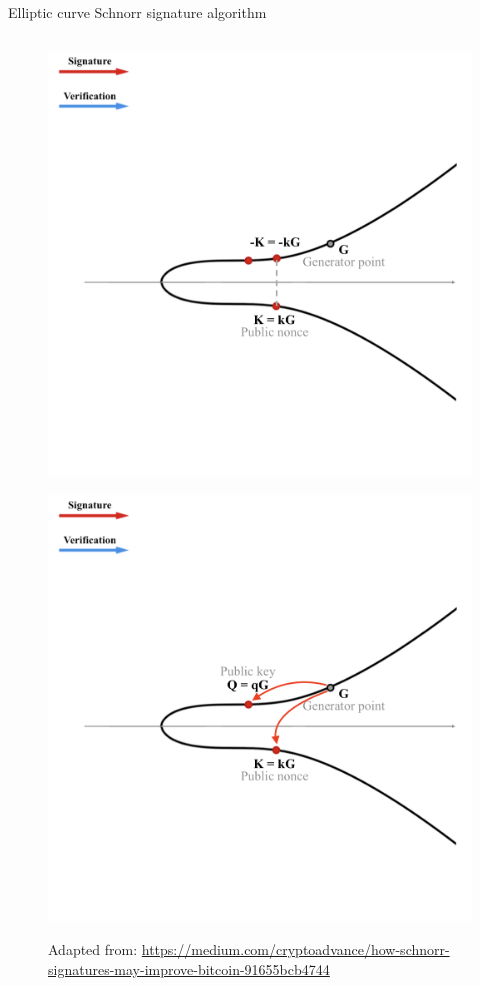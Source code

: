 \documentclass[slidescentered]{beamer}
\newcommand{\source}[1]{\caption*{\tiny Adapted from: {#1}} }
\begin{document}
\begin{frame}{Elliptic curve Schnorr signature algorithm}
\begin{columns}
\begin{column}{0.5\linewidth}
\begin{figure}
{						\source{\tiny \url{https://medium.com/cryptoadvance/how-schnorr-signatures-may-improve-bitcoin-91655bcb4744}}}
					 {\vspace*{-0.7cm}
						\hspace*{-0.9cm}
						\includegraphics[scale=0.28]{images/Schnorr4}
						\source{\tiny \url{https://medium.com/cryptoadvance/how-schnorr-signatures-may-improve-bitcoin-91655bcb4744}}}
					 {\vspace*{-0.7cm}
						\hspace*{-0.9cm}
						\includegraphics[scale=0.28]{images/Schnorr3}
}
\end{figure}
\end{column}
\end{columns}
\end{frame}
\end{document}
